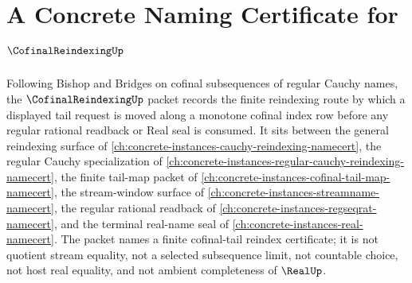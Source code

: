 \chapter{A Concrete Naming Certificate for $\CofinalReindexingUp$}
\label{ch:concrete-instances-cofinal-reindexing-namecert}

Following Bishop and Bridges on cofinal subsequences of regular Cauchy names, the $\CofinalReindexingUp$ packet records the finite reindexing route by which a displayed tail request is moved along a monotone cofinal index row before any regular rational readback or Real seal is consumed. It sits between the general reindexing surface of \autoref{ch:concrete-instances-cauchy-reindexing-namecert}, the regular Cauchy specialization of \autoref{ch:concrete-instances-regular-cauchy-reindexing-namecert}, the finite tail-map packet of \autoref{ch:concrete-instances-cofinal-tail-map-namecert}, the stream-window surface of \autoref{ch:concrete-instances-streamname-namecert}, the regular rational readback of \autoref{ch:concrete-instances-regseqrat-namecert}, and the terminal real-name seal of \autoref{ch:concrete-instances-real-namecert}. The packet names a finite cofinal-tail reindex certificate; it is not quotient stream equality, not a selected subsequence limit, not countable choice, not host real equality, and not ambient completeness of $\RealUp$.

